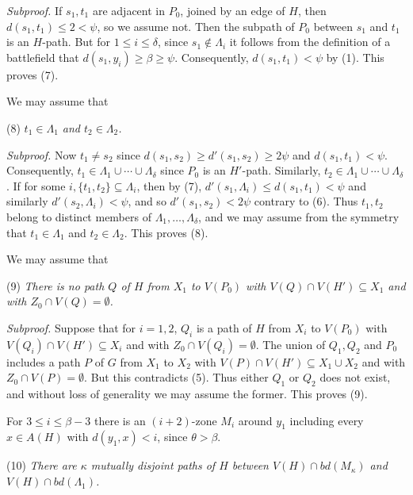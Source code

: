 \textit{Subproof.} If $s_1, t_1$ are adjacent in $P_0$, joined by an edge of $H$, then $d(s_1, t_1) \le 2 < \psi$, so we assume not. Then the subpath of $P_0$ between $s_1$ and $t_1$ is an $H$-path. But for $1 \le i \le \delta$, since $s_1 \notin \Lambda_i$ it follows from the definition of a battlefield that $d(s_1, y_i) \ge \beta \ge \psi$. Consequently, $d(s_1, t_1) < \psi$ by (1). This proves (7).

We may assume that

\hspace*{12pt}(8) \textit{$t_1 \in \Lambda_1$ and $t_2 \in \Lambda_2$.}

\textit{Subproof.} Now $t_1 \ne s_2$ since $d(s_1, s_2) \ge d'(s_1, s_2) \ge 2\psi$ and $d(s_1, t_1) < \psi$. Consequently, $t_1 \in \Lambda_1 \cup \cdots \cup \Lambda_\delta$ since $P_0$ is an $H'$-path. Similarly, $t_2 \in \Lambda_1 \cup \cdots \cup \Lambda_\delta$. If for some $i, \{t_1, t_2\} \subseteq \Lambda_i$, then by (7), $d'(s_1, \Lambda_i) \le d(s_1, t_1) < \psi$ and similarly $d'(s_2, \Lambda_i) < \psi$, and so $d'(s_1, s_2) < 2\psi$ contrary to (6). Thus $t_1, t_2$ belong to distinct members of $\Lambda_1, \ldots, \Lambda_\delta$, and we may assume from the symmetry that $t_1 \in \Lambda_1$ and $t_2 \in \Lambda_2$. This proves (8).

We may assume that

\hspace*{12pt}(9) \textit{There is no path $Q$ of $H$ from $X_1$ to $V(P_0)$ with $V(Q) \cap V(H') \subseteq X_1$ and with $Z_0 \cap V(Q) = \emptyset$.}

\textit{Subproof.} Suppose that for $i = 1, 2$, $Q_i$ is a path of $H$ from $X_i$ to $V(P_0)$ with $V(Q_i) \cap V(H') \subseteq X_i$ and with $Z_0 \cap V(Q_i) = \emptyset$. The union of $Q_1, Q_2$ and $P_0$ includes a path $P$ of $G$ from $X_1$ to $X_2$ with $V(P) \cap V(H') \subseteq X_1 \cup X_2$ and with $Z_0 \cap V(P) = \emptyset$. But this contradicts (5). Thus either $Q_1$ or $Q_2$ does not exist, and without loss of generality we may assume the former. This proves (9).

For $3 \le i \le \beta - 3$ there is an $(i + 2)$-zone $M_i$ around $y_1$ including every $x \in A(H)$ with $d(y_1, x) < i$, since $\theta > \beta$.

\hspace*{12pt}(10) \textit{There are $\kappa$ mutually disjoint paths of $H$ between $V(H) \cap bd(M_\kappa)$ and $V(H) \cap bd(\Lambda_1)$.}


